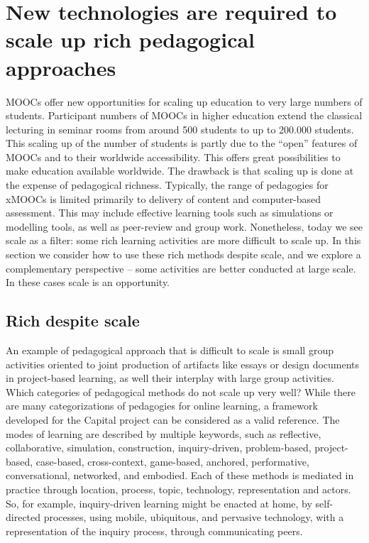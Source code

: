 \section{New technologies are required to scale up rich pedagogical approaches}


MOOCs offer new opportunities for scaling up education to very large
numbers of students. Participant numbers of MOOCs in higher education
extend the classical lecturing in seminar rooms from around 500 students
to up to 200.000 students. This scaling up of the number of students is
partly due to the “open” features of MOOCs and to their worldwide
accessibility. This offers great possibilities to make education
available worldwide.  The drawback is that scaling up is done at the
expense of pedagogical richness. Typically, the range of pedagogies for
xMOOCs is limited primarily to delivery of content and computer-based
assessment. This may include effective learning tools such as
simulations or modelling tools, as well as peer-review and group
work. Nonetheless, today we see scale as a filter: some rich learning
activities are more difficult to scale up. In this section we consider
how to use these rich methods despite scale, and we explore a
complementary perspective -- some activities are better conducted at
large scale. In these cases scale is an opportunity.  

\subsection{Rich despite scale}

An example of pedagogical approach that is difficult to scale is small
group activities oriented to joint production of artifacts like essays
or design documents in project-based learning, as well their interplay
with large group activities. Which categories of pedagogical methods do
not scale up very well? While there are many categorizations of
pedagogies for online learning, a framework developed for the Capital
project can be considered as a valid reference. The modes of learning
are described by multiple keywords, such as reflective, collaborative,
simulation, construction, inquiry-driven, problem-based, project-based,
case-based, cross-context, game-based, anchored, performative,
conversational, networked, and embodied. Each of these methods is
mediated in practice through location, process, topic, technology,
representation and actors. So, for example, inquiry-driven learning
might be enacted at home, by self-directed processes, using mobile,
ubiquitous, and pervasive technology, with a representation of the
inquiry process, through communicating peers.

